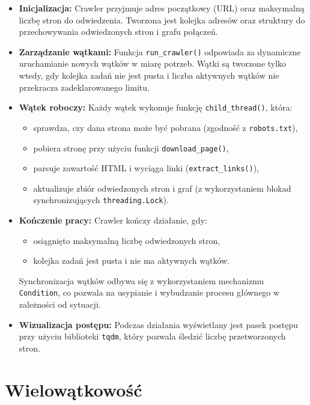 \begin{itemize}
    \item \textbf{Inicjalizacja:} Crawler przyjmuje adres początkowy (URL) oraz maksymalną liczbę stron do odwiedzenia. Tworzona jest kolejka adresów oraz struktury do przechowywania odwiedzonych stron i grafu połączeń.
    
    \item \textbf{Zarządzanie wątkami:} Funkcja \texttt{run\_crawler()} odpowiada za dynamiczne uruchamianie nowych wątków w miarę potrzeb. Wątki są tworzone tylko wtedy, gdy kolejka zadań nie jest pusta i liczba aktywnych wątków nie przekracza zadeklarowanego limitu.
    
    \item \textbf{Wątek roboczy:} Każdy wątek wykonuje funkcję \texttt{child\_thread()}, która:
    \begin{itemize}
        \item sprawdza, czy dana strona może być pobrana (zgodność z \texttt{robots.txt}),
        \item pobiera stronę przy użyciu funkcji \texttt{download\_page()},
        \item parsuje zawartość HTML i wyciąga linki (\texttt{extract\_links()}),
        \item aktualizuje zbiór odwiedzonych stron i graf (z wykorzystaniem blokad synchronizujących \texttt{threading.Lock}).
    \end{itemize}

    \item \textbf{Kończenie pracy:} Crawler kończy działanie, gdy:
    \begin{itemize}
        \item osiągnięto maksymalną liczbę odwiedzonych stron,
        \item kolejka zadań jest pusta i nie ma aktywnych wątków.
    \end{itemize}
    Synchronizacja wątków odbywa się z wykorzystaniem mechanizmu \texttt{Condition}, co pozwala na usypianie i wybudzanie procesu głównego w zależności od sytuacji.

    \item \textbf{Wizualizacja postępu:} Podczas działania wyświetlany jest pasek postępu przy użyciu biblioteki \texttt{tqdm}, który pozwala śledzić liczbę przetworzonych stron.
\end{itemize}

\section{Wielowątkowość}

